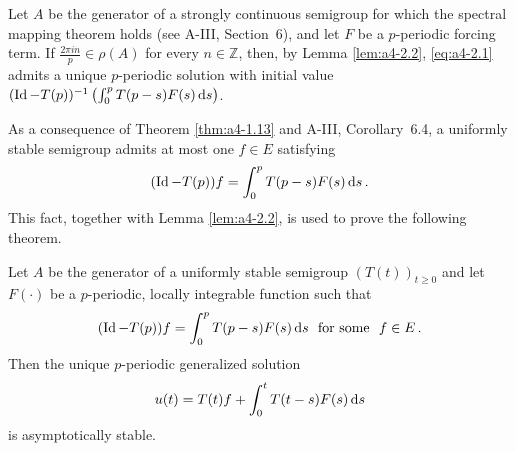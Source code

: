 \begin{remark}\label{rem:a4-2.3}
Let $A$ be the generator of a strongly continuous semigroup for which the spectral mapping theorem holds (see A-III, Section~6), and let $F$ be a $p$-periodic forcing term.
If $\frac{2\pi in}{p} \in \rho(A)$ for every $n \in \mathbb{Z}$, then, by Lemma \ref{lem:a4-2.2}, \eqref{eq:a4-2.1}
admits a unique $p$-periodic solution with initial value $(\operatorname{Id} - T(p))^{-1} \left(\int_{0}^{p} T(p-s)F(s)  \mathop{}\!\mathrm{d}{s}\right)$.
\end{remark}
As a consequence of Theorem \ref{thm:a4-1.13}  and A-III, Corollary~6.4,  a uniformly stable semigroup admits at most one $f \in E$ satisfying 
\[
(\operatorname{Id}-T(p))f = \int_{0}^{p} T(p-s)F(s)  \mathop{}\!\mathrm{d}{s}\,.
\]
This fact, together with Lemma \ref{lem:a4-2.2}, is used to prove the following theorem.
\begin{theorem}\label{thm:a4-2.4}
Let $A$ be the generator of a uniformly stable semigroup $(T(t))_{t \geq 0}$ and let $F(\cdot)$ be a $p$-periodic, locally integrable function such that 
\[{
(\operatorname{Id} - T(p))f = \int_{0}^{p} T(p-s)F(s)  \mathop{}\!\mathrm{d}{s} \ \text{ for some } \ f \in E\,.
}
\]
Then the unique $p$-periodic generalized solution
\[
u(t) = T(t)f + \int_{0}^{t} T(t-s)F(s)  \mathop{}\!\mathrm{d}{s}
\]
is asymptotically stable.
\end{theorem}
